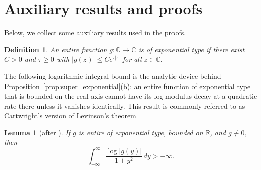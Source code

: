 \documentclass[11pt,twoside]{article} %
\newtheorem{lemma}{Lemma}
\newtheorem{definition}{Definition}
\begin{document}
\section{Auxiliary results and proofs}
\label{app:auxiliary}

Below, we collect some auxiliary results used in the proofs.
\begin{definition}\label{def:exp_type}
An entire function $g:\mathbb C\to\mathbb C$ is of \emph{exponential type} if there exist $C>0$ and
$\tau\ge0$ with $|g(z)|\le Ce^{\tau|z|}$ for all $z\in\mathbb C$.
\end{definition}

The following logarithmic-integral bound is the analytic device behind
Proposition~\ref{prop:super_exponential}(b): an entire function of exponential type that is bounded on the
real axis cannot have its log-modulus decay at a quadratic rate there unless it vanishes identically. This result is commonly referred to as Cartwright's version of Levinson's theorem

\begin{lemma}[after {\citealp[Section~III.G]{koosis1988logarithmic}}]\label{lem:log_bound}
If $g$ is entire of exponential type, bounded on $\mathbb R$, and $g\not\equiv0$, then
\begin{equation*}
    \int_{-\infty}^{\infty}\frac{\log|g(y)|}{1+y^2}\,dy>-\infty.
\end{equation*}
\end{lemma}
\end{document}
